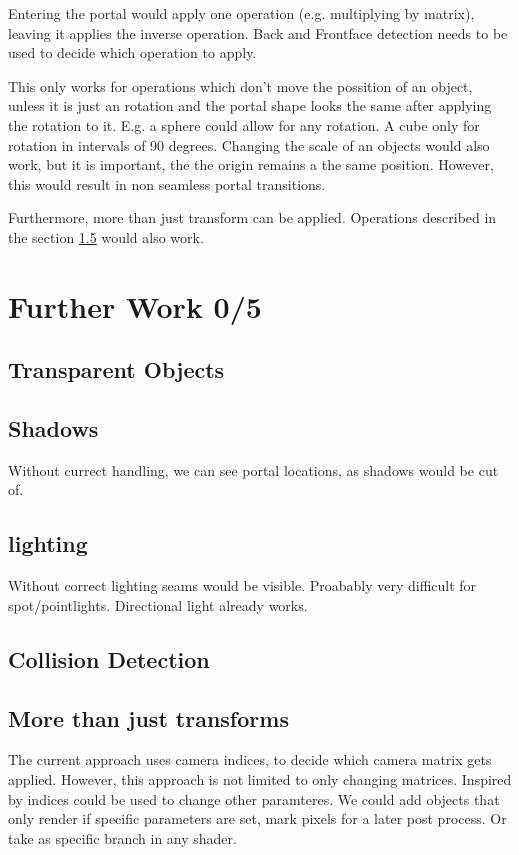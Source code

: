 Entering the portal would apply one operation (e.g. multiplying by matrix), leaving it applies the inverse operation. Back and Frontface detection needs to be used to decide which operation to apply.


This only works for operations which don't move the possition of an object, unless it is just an rotation and the portal shape looks the same after applying the rotation to it. E.g. a sphere could allow for any rotation. A cube only for rotation in intervals of 90 degrees.
Changing the scale of an objects would also work, but it is important, the the origin remains a the same position. However, this would result in non seamless portal transitions.

Furthermore, more than just transform can be applied. Operations described in the section \ref{more than transforms} would also work.



\section{Further Work 0/5}
\subsection{Transparent Objects}
\subsection{Shadows}
Without currect handling, we can see portal locations, as shadows would be cut of.
\subsection{lighting}
Without correct lighting seams would be visible. Proabably very difficult for spot/pointlights. Directional light already works.
\subsection{Collision Detection}

\subsection{More than just transforms}
\label{more than transforms}
The current approach uses camera indices, to decide which camera matrix gets applied. However, this approach is not limited to only changing matrices. Inspired by \cite{borst:2009:real} indices could be used to change other paramteres. We could add objects that only render if specific parameters are set, mark pixels for a later post process. Or take as specific branch in any shader.


